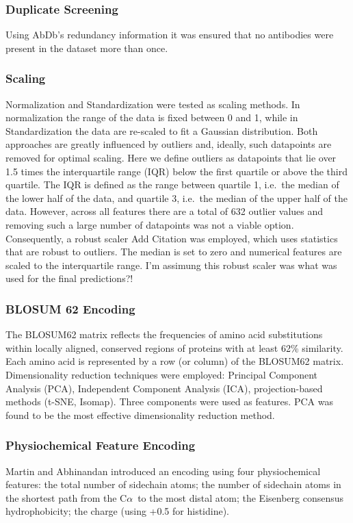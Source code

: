 \documentclass[12pt]{article}
\newcommand{\ca}{\mbox{C$\alpha$}}
\newcommand{\lilian}[1]{ {\color{red}{\bfseries Lilian:} #1}}
\let\shortcite\cite
\begin{document}
\subsubsection{Duplicate Screening}
Using AbDb's redundancy information it was ensured that no antibodies
were present in the dataset more than once.

\subsubsection{Scaling}
Normalization and Standardization were tested as scaling methods. In normalization the range of the data is fixed between 0 and 1, while in Standardization the data are re-scaled to fit a Gaussian distribution. Both
approaches are greatly influenced by outliers and, ideally, such datapoints are
removed for optimal scaling. Here we define outliers as
datapoints that lie over 1.5 times the interquartile range (IQR) below
the first quartile or above the third quartile. The IQR is defined as
the range between quartile 1, i.e.\ the median of the lower half of the
data, and quartile 3, i.e.\ the median of the upper half of the
data. However, across all features there are a total of 632 outlier
values and removing such a large number of datapoints was not a viable
option. Consequently, a robust scaler\cite{XXXX} \lilian{Add Citation} was employed, which uses statistics that are
robust to outliers. The median is set to zero and numerical features
are scaled to the interquartile range. \lilian{I'm assimung this
  robust scaler was what was used for the final predictions?!}

\subsubsection{BLOSUM 62 Encoding}
The BLOSUM62 matrix reflects the frequencies of amino acid
substitutions within locally aligned, conserved regions of proteins
with at least 62\% similarity. Each amino acid is represented by a row
(or column) of the BLOSUM62 matrix. Dimensionality reduction
techniques were employed: Principal Component Analysis (PCA),
Independent Component Analysis (ICA), projection-based methods (t-SNE,
Isomap). Three components were used as features. PCA was found to be the most effective dimensionality reduction method. 

\subsubsection{Physiochemical Feature Encoding}
Martin and Abhinandan\shortcite{Abhinandan2010} introduced an encoding using
four physiochemical features:
the total number of sidechain atoms; the
number of sidechain atoms in the shortest path from the \ca\ to the most
distal atom; the Eisenberg consensus
hydrophobicity\cite{Eisenberg1982}; the charge (using +0.5 for histidine).
\end{document}
